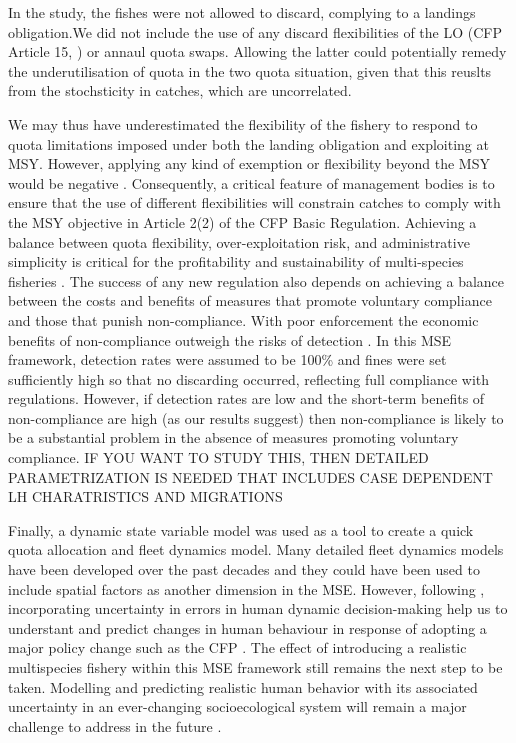 \documentclass[12pt,oneline,a4paper,numbib]{ouparticle}
\numberwithin{equation}{subsection} %
\begin{document}
In the study, the fishes were not allowed to discard, complying to a landings obligation.We did not include the use of any discard flexibilities of the LO (CFP Article 15, \cite{CFP2013}) or annaul quota swaps. Allowing the latter could potentially remedy the underutilisation of quota in the two quota situation, given that this reuslts from the stochsticity in catches, which are uncorrelated.

 We may thus have underestimated the flexibility of the fishery to respond to quota limitations imposed under both the landing obligation and exploiting at MSY. However, applying any kind of exemption or flexibility beyond the MSY would be negative \cite{Prellezo2016}. Consequently, a critical feature of management bodies is to ensure that the use of different flexibilities will constrain catches to comply with the MSY objective in Article 2(2) of the CFP Basic Regulation. Achieving a balance between quota flexibility, over-exploitation risk, and administrative simplicity is critical for the profitability and sustainability of multi-species fisheries \cite{Alzorriz2018}. The success of any new regulation also depends on achieving a balance between the costs and benefits of measures that promote voluntary compliance and those that punish non-compliance. With poor enforcement the economic benefits of non-compliance outweigh the risks of detection \cite{Catchpole2015, Batsleer2013}. In this MSE framework, detection rates were assumed to be 100\% and fines were set sufficiently high so that no discarding occurred, reflecting full compliance with regulations. However, if detection rates are low and the short-term benefits of non-compliance are high (as our results suggest) then non-compliance is likely to be a substantial problem in the absence of measures promoting voluntary compliance. IF YOU WANT TO STUDY THIS, THEN DETAILED PARAMETRIZATION IS NEEDED THAT INCLUDES CASE DEPENDENT LH CHARATRISTICS AND MIGRATIONS

Finally, a dynamic state variable model was used as a tool to create a quick quota allocation and fleet dynamics model. Many detailed fleet dynamics models have been developed over the past decades \cite{Abbott2011, Ono2017, Simons2015} and they could have been used to include spatial factors as another dimension in the MSE. However, following \cite{Dowling2011}, incorporating uncertainty in errors in human dynamic decision-making help us to understant and predict changes in human behaviour in response of adopting a major policy change such as the CFP \cite{CFP2013}. The effect of introducing a realistic multispecies fishery within this MSE framework still remains the next step to be taken. Modelling and predicting realistic human behavior with its associated uncertainty in an ever-changing socioecological system will remain a major challenge to address in the future \cite{Ono2017}.
\end{document}
